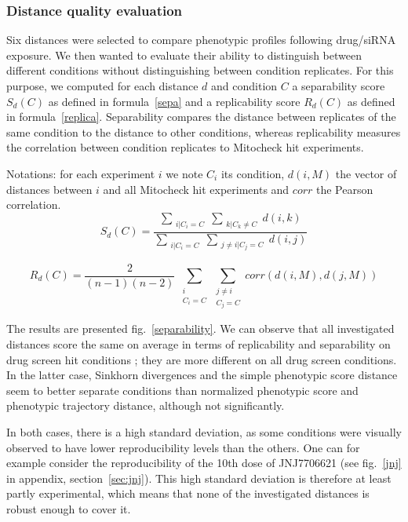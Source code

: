 \subsubsection{Distance quality evaluation\\}
Six distances were selected to compare phenotypic profiles following drug/siRNA exposure. We then wanted to evaluate their ability to distinguish between different conditions without distinguishing between condition replicates. For this purpose, we computed for each distance $d$ and condition $C$ a separability score $S_d(C)$ as defined in formula~\ref{sepa} and a replicability score $R_d(C)$ as defined in formula~\ref{replica}. Separability compares the distance between replicates of the same condition to the distance to other conditions, whereas replicability measures the correlation between condition replicates to Mitocheck hit experiments.

Notations: for each experiment $i$ we note $C_i$ its condition,
$d(i,M)$ the vector of distances between $i$ and all Mitocheck hit
experiments and $corr$ the Pearson correlation. 
\begin{equation}
S_d(C)=\dfrac{\sum_{\substack{i|C_i= C}} \sum_{\substack{k|C_k\neq C}} d(i,k)}{\sum_{\substack{i|C_i= C}} \sum_{\substack{j\neq i| C_j = C}} d(i,j)}
\label{sepa}
\end{equation}

\begin{equation}
R_d(C)=\dfrac{2}{(n-1)(n-2)}~ \sum_{\substack{i\\C_i= C}} \sum_{\substack{j\neq i\\ C_j = C}} corr(d(i,M), d(j,M))
\label{replica}
\end{equation}

The results are presented fig.~\ref{separability}. We can observe that all investigated distances score the same on average in terms of replicability and separability on drug screen hit conditions ; they are more different on all drug screen conditions. In the latter case, Sinkhorn divergences and the simple phenotypic score distance seem to better separate conditions than normalized phenotypic score and phenotypic trajectory distance, although not significantly. 

In both cases, there is a high standard deviation, as some conditions were visually observed to have lower reproducibility levels than the others. One can for example consider the reproducibility of the 10th dose of JNJ7706621 (see fig.~\ref{jnj} in appendix, section~\ref{sec:jnj}). This high standard deviation is therefore at least partly experimental, which means that none of the investigated distances is robust enough to cover it.

